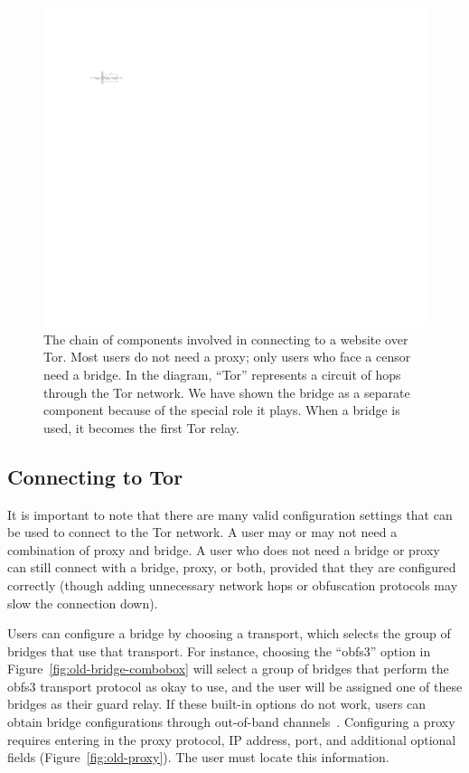 \documentclass[USenglish,oneside,twocolumn]{article}
\begin{document}
\begin{figure}
\centering
\includegraphics{topology.pdf}
\caption{
The chain of components involved in connecting to a website over Tor.
Most users do not need a proxy;
only users who face a censor need a bridge.
In the diagram, ``Tor'' represents a circuit of hops through the Tor network.
We have shown the bridge as a separate component
because of the special role it plays.
When a bridge is used, it becomes the first Tor relay.
}
\label{fig:topology}
\end{figure}

\subsection{Connecting to Tor} 
It is important to note that there are many valid configuration settings that can be used to connect to the Tor network. A user may or may not need a combination of proxy and bridge.
A user who does not need a bridge or proxy can still connect with a bridge, proxy, or both, provided that they are configured correctly (though adding unnecessary network hops or obfuscation protocols may slow the connection down).

Users can configure a bridge by choosing a transport, which selects the group of bridges that use that transport. For instance, choosing the ``obfs3'' option in Figure~\ref{fig:old-bridge-combobox} will select a group of bridges that perform the obfs3 transport protocol as okay to use, and the user will be assigned one of these bridges as their guard relay. If these built-in options do not work, users can obtain bridge configurations through out-of-band channels~\cite{bridgedb}. Configuring a proxy requires entering in the proxy protocol, IP address, port, and additional optional fields (Figure~\ref{fig:old-proxy}). The user must locate this information.
\end{document}
